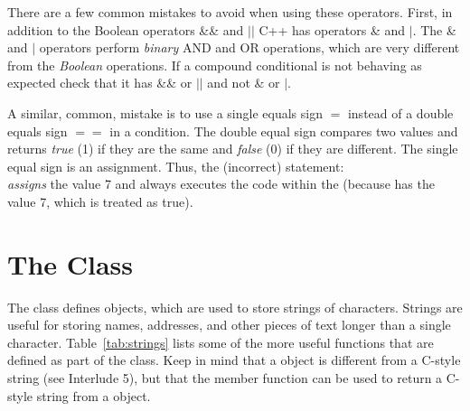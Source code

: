 There are a few common mistakes to avoid when using these operators.  First, in addition to the Boolean operators \&\& and $||$ C++ has operators \& and $|$.  The \& and $|$  operators perform \emph{binary} AND and OR operations, which are very different from the \emph{Boolean} operations.  If a compound conditional is not behaving as expected check that it has \&\& or $||$ and not  \& or $|$.  

A similar, common, mistake is to use a single equals sign $=$ instead of a double equals sign $==$ in a condition.  The double equal sign compares two values and returns \emph{true} (1) if they are the same and \emph{false} (0) if they are different.  The single equal sign is an assignment.  Thus, the (incorrect) statement:\\
\emph{assigns}  the value 7 and always executes the code within the  (because  has the value 7, which is treated as true). 



\section{The  Class}\label{appendix:string}

The  class defines  objects, which are used to store strings of characters.  Strings are useful for storing names, addresses, and other pieces of text longer than a single character.
Table~\ref{tab:strings} lists some of the more useful functions that are defined as part of the  class.  Keep in mind that a  object is different from a C-style string (see Interlude 5), but that the member function  can be used to return a C-style string from a  object.

